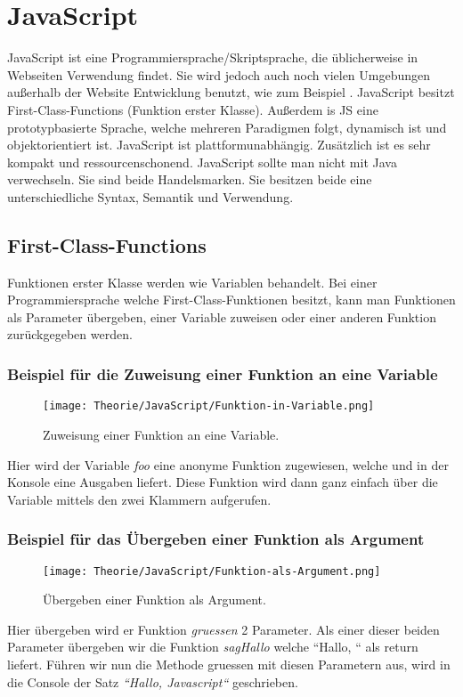 \section{JavaScript}
\label{js}

JavaScript ist eine Programmiersprache/Skriptsprache, die üblicherweise in Webseiten Verwendung 
findet. Sie wird jedoch auch noch vielen Umgebungen außerhalb der Website Entwicklung benutzt, wie 
zum Beispiel . JavaScript besitzt First-Class-Functions (Funktion erster Klasse). 
Außerdem is JS eine prototypbasierte Sprache, welche mehreren Paradigmen folgt, dynamisch ist und 
objektorientiert ist. JavaScript ist plattformunabhängig. Zusätzlich ist es sehr kompakt und 
ressourcenschonend. JavaScript sollte man nicht mit Java verwechseln. Sie sind beide Handelsmarken. 
Sie besitzen beide eine unterschiedliche Syntax, Semantik und Verwendung.~\cite{JS}

\subsection{First-Class-Functions}
Funktionen erster Klasse werden wie Variablen behandelt. Bei einer Programmiersprache welche 
First-Class-Funktionen besitzt, kann man Funktionen als Parameter übergeben, einer Variable 
zuweisen oder einer anderen Funktion zurückgegeben werden.
\pagebreak

\begin{center}
    \subsubsection{Beispiel für die Zuweisung einer Funktion an eine Variable}
\begin{figure}[htbp]
    \centerline{\texttt{[image: Theorie/JavaScript/Funktion-in-Variable.png]}}
    \caption{Zuweisung einer Funktion an eine Variable.~\cite{First-Class-Funktion}}
\end{figure}
\end{center}
Hier wird der Variable \textit{foo} eine anonyme Funktion zugewiesen, welche und in der Konsole 
eine Ausgaben liefert. Diese Funktion wird dann ganz einfach über die Variable mittels den zwei 
Klammern aufgerufen.


\begin{center}
    \subsubsection{Beispiel für das Übergeben einer Funktion als Argument}
\begin{figure}[htbp]
    \centerline{\texttt{[image: Theorie/JavaScript/Funktion-als-Argument.png]}}
    \caption{Übergeben einer Funktion als Argument.~\cite{First-Class-Funktion}}
\end{figure}
\end{center}
Hier übergeben wird er Funktion \textit{gruessen} 2 Parameter. Als einer dieser beiden Parameter 
übergeben wir die Funktion \textit{sagHallo} welche ``Hallo, `` als return liefert. Führen wir nun 
die Methode gruessen mit diesen Parametern aus, wird in die Console der Satz 
\textit{``Hallo, Javascript``} geschrieben.
\pagebreak

